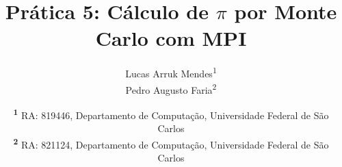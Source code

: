 \documentclass[onecolumn]{NobArticle}
\title{Prática 5: Cálculo de $\pi$ por Monte Carlo com MPI}
\author{
    Lucas Arruk Mendes\textsuperscript{1}\\
    Pedro Augusto Faria\textsuperscript{2}
}
\date{
    \textsuperscript{\textbf{1}}
    RA: 819446, Departamento de Computação, Universidade Federal de São Carlos\\
    \textsuperscript{\textbf{2}}
    RA: 821124, Departamento de Computação, Universidade Federal de São Carlos\\
}
\begin{document}
\small
\maketitle








\printbibliography
\end{document}

